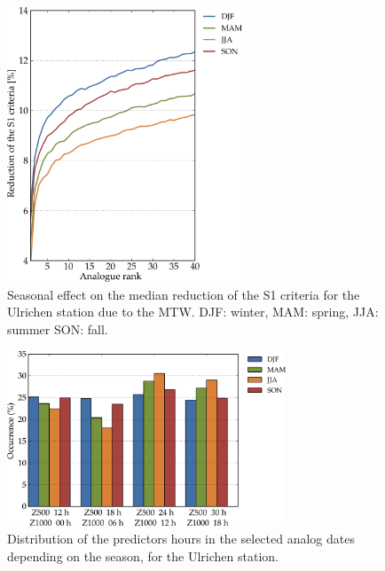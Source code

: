 \documentclass[hess, manuscript]{copernicus}
\begin{document}
\begin{figure}[htb]
	\begin{center}
		\includegraphics[width=7cm]{figures/changes_S1_seasons.pdf}
	\end{center}
	\caption{Seasonal effect on the median reduction of the S1 criteria for the Ulrichen station due to the MTW. DJF: winter, MAM: spring, JJA: summer SON: fall.}
	\label{fig:changes_S1_seasons}
\end{figure}

\begin{figure}[htb]
	\includegraphics[width=8.3cm]{figures/hours_selection_per_season.pdf}
	\caption{Distribution of the predictors hours in the selected analog dates depending on the season, for the Ulrichen station.}
	\label{fig:hours_selection_per_season}
\end{figure}
\end{document}
